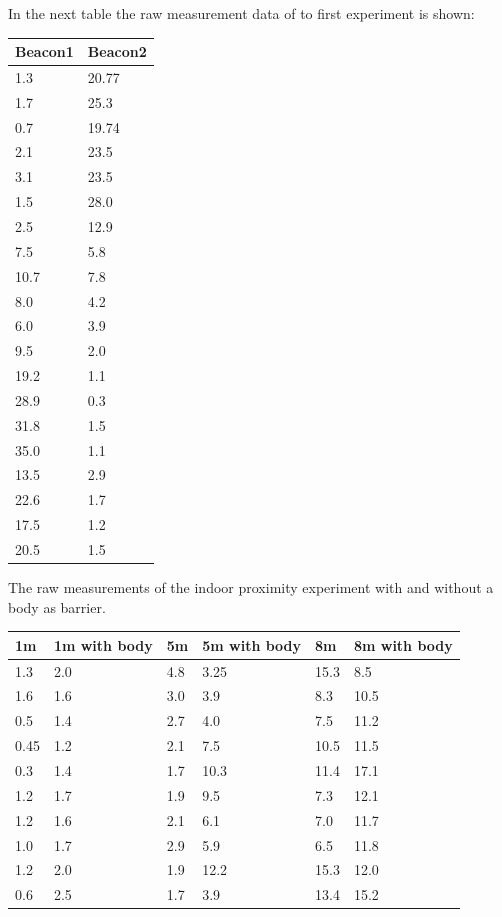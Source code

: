 In the next table the raw measurement data of to first experiment is shown: \\
\begin{singlespace}
\begin{tabular}{|p{3cm}|p{3cm}|} \hline

\textbf{Beacon1} & \textbf{Beacon2} \\ \hline
1.3&20.77\\ \hline
1.7&25.3\\ \hline
0.7&19.74\\ \hline
2.1&23.5\\ \hline
3.1&23.5\\ \hline
1.5&28.0\\ \hline
2.5&12.9\\ \hline
7.5&5.8\\ \hline
10.7&7.8\\ \hline
8.0&4.2\\ \hline
6.0&3.9\\ \hline
9.5&2.0\\ \hline
19.2&1.1\\ \hline
28.9&0.3\\ \hline
31.8&1.5\\ \hline
35.0&1.1\\ \hline
13.5&2.9\\ \hline
22.6&1.7\\ \hline
17.5&1.2\\ \hline
20.5&1.5\\ \hline

\end{tabular}
\end{singlespace}

The raw measurements of the indoor proximity experiment with and without a body as barrier. \\ 




\begin{tabular}{|p{2.0cm}|p{2cm}|p{2.0cm}|p{2.0cm}|p{2cm}|p{2cm}|} \hline
1m&1m with body&5m &5m with body &8m&8m with body \\ \hline 
1.3&2.0&4.8&3.25&15.3&8.5 \\ \hline
1.6&1.6&3.0&3.9&8.3&10.5\\ \hline
0.5&1.4&2.7&4.0&7.5&11.2\\ \hline
0.45&1.2&2.1&7.5&10.5&11.5\\ \hline
0.3&1.4&1.7&10.3&11.4&17.1\\ \hline
1.2&1.7&1.9&9.5&7.3&12.1\\ \hline
1.2&1.6&2.1&6.1&7.0&11.7\\ \hline
1.0&1.7&2.9&5.9&6.5&11.8\\ \hline
1.2&2.0&1.9&12.2&15.3&12.0\\ \hline
0.6&2.5&1.7&3.9&13.4&15.2\\ \hline
\end{tabular}

